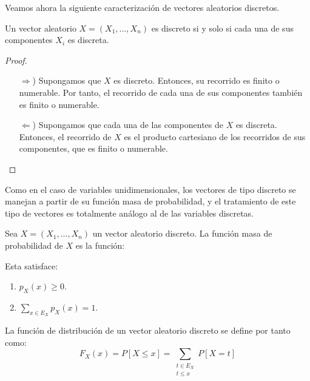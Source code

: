 Veamos ahora la siguiente caracterización de vectores aleatorios discretos.
\begin{teo}
    Un vector aleatorio $X=(X_1, \ldots, X_n)$ es discreto si y solo si cada una de sus componentes $X_i$ es discreta.
\end{teo}
\begin{proof}~
    \begin{itemize}
        \item[$\Longrightarrow$)] Supongamos que $X$ es discreto. Entonces, su recorrido es finito o numerable. Por tanto, el recorrido de cada una de sus componentes también es finito o numerable.
        \item[$\Longleftarrow$)] Supongamos que cada una de las componentes de $X$ es discreta. Entonces, el recorrido de $X$ es el producto cartesiano de los recorridos de sus componentes, que es finito o numerable.
    \end{itemize}
\end{proof}

Como en el caso de variables unidimensionales, los vectores de tipo discreto se manejan a partir de su función masa de probabilidad, y el tratamiento de este tipo de vectores es totalmente análogo al de las variables discretas.
\begin{definicion}
    Sea $X=(X_1, \ldots, X_n)$ un vector aleatorio discreto. La función masa de probabilidad de $X$ es la función:
\end{definicion}

Esta satisface:
\begin{enumerate}
    \item $p_X(x)\geq 0$.
    \item $\sum\limits_{x\in E_X} p_X(x) = 1$.
\end{enumerate}

La función de distribución de un vector aleatorio discreto se define por tanto como:
\begin{equation*}
    F_X(x) = P[X\leq x] = \sum_{\substack{t\in E_X\\t\leq x}} P[X=t]
\end{equation*}



